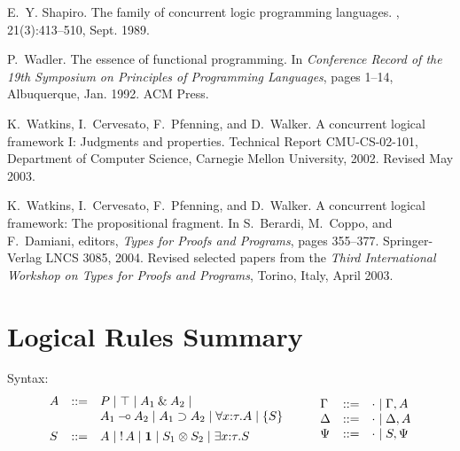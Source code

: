 \documentclass{sig-alt}
\begin{document}
\begin{thebibliography}{50}
E.~Y. Shapiro.
\newblock The family of concurrent logic programming languages.
, 21(3):413--510, Sept. 1989.

P.~Wadler.
\newblock The essence of functional programming.
\newblock In {\em Conference Record of the 19th Symposium on Principles of
  Programming Languages}, pages 1--14, Albuquerque, Jan. 1992. ACM Press.

K.~Watkins, I.~Cervesato, F.~Pfenning, and D.~Walker.
\newblock A concurrent logical framework {I}: Judgments and properties.
\newblock Technical Report CMU-CS-02-101, Department of Computer Science,
  Carnegie Mellon University, 2002.
\newblock Revised May 2003.

K.~Watkins, I.~Cervesato, F.~Pfenning, and D.~Walker.
\newblock A concurrent logical framework: The propositional fragment.
\newblock In S.~Berardi, M.~Coppo, and F.~Damiani, editors, {\em Types for
  Proofs and Programs}, pages 355--377. Springer-Verlag LNCS 3085, 2004.
\newblock Revised selected papers from the {\em Third International Workshop on
  Types for Proofs and Programs}, Torino, Italy, April 2003.

\end{thebibliography}

\appendix
\section*{Logical Rules Summary}
\label{apx:logical-rules-summary}
\onecolumn
\noindent Syntax:
$$
\begin{array}{lll}
A & ::= &  P 
      \mid \top 
      \mid A_1 \with A_2 
      \mid \\&& A_1 \limp A_2 
      \mid A_1 \iimp A_2 
      \mid \forall x{:}\tau.A  
      \mid \{ S \} 
\\[1ex]
S & ::= &  A
      \mid \bang A
      \mid \one 
      \mid S_1 \tensor S_2 
      \mid \exists x{:}\tau.S 
\end{array}
\qquad
\begin{array}{lll}
  \Gamma & ::= & \cdot \mid \Gamma, A \\
  \Delta & ::= & \cdot \mid \Delta, A \\%
  \Psi   & ::= & \cdot \mid S, \Psi \\
\end{array}
$$
\end{document}
